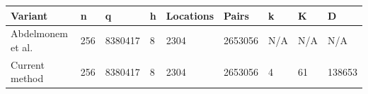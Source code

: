 \begin{tabular}{lllllllll}
\hline
Variant & n & q & h & Locations & Pairs & k & K & D \\
\hline
Abdelmonem et al. & 256 & 8380417 & 8 & 2304 & 2653056 & N/A & N/A & N/A \\
Current method & 256 & 8380417 & 8 & 2304 & 2653056 & 4 & 61 & 138653 \\
\hline
\end{tabular}
